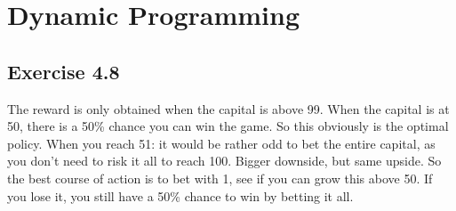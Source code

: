 \chapter{Dynamic Programming}

\section{Exercise 4.8}
The reward is only obtained when the capital is above 99. When the capital is at 50, there is a 50\% chance you can win the game. So this obviously is the optimal policy. When you reach 51: it would be rather odd to bet the entire capital, as you don't need to risk it all to reach 100. Bigger downside, but same upside. So the best course of action is to bet with 1, see if you can grow this above 50. If you lose it, you still have a 50\% chance to win by betting it all.